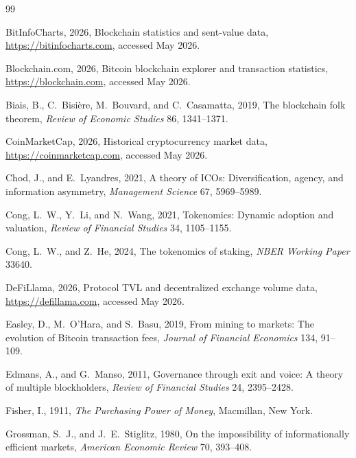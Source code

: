 \documentclass[12pt]{article}
\begin{document}
\begin{thebibliography}{99}

BitInfoCharts, 2026, Blockchain statistics and sent-value data,
\url{https://bitinfocharts.com}, accessed May 2026.

Blockchain.com, 2026, Bitcoin blockchain explorer and transaction statistics,
\url{https://blockchain.com}, accessed May 2026.

Biais, B., C.~Bisière, M.~Bouvard, and C.~Casamatta, 2019, The blockchain folk theorem,
\textit{Review of Economic Studies} 86, 1341--1371.

CoinMarketCap, 2026, Historical cryptocurrency market data,
\url{https://coinmarketcap.com}, accessed May 2026.

Chod, J., and E.~Lyandres, 2021, A theory of ICOs: Diversification, agency, and
information asymmetry, \textit{Management Science} 67, 5969--5989.

Cong, L.~W., Y.~Li, and N.~Wang, 2021, Tokenomics: Dynamic adoption and valuation,
\textit{Review of Financial Studies} 34, 1105--1155.

Cong, L.~W., and Z.~He, 2024, The tokenomics of staking,
\textit{NBER Working Paper} 33640.

DeFiLlama, 2026, Protocol TVL and decentralized exchange volume data,
\url{https://defillama.com}, accessed May 2026.

Easley, D., M.~O'Hara, and S.~Basu, 2019, From mining to markets: The evolution of
Bitcoin transaction fees, \textit{Journal of Financial Economics} 134, 91--109.

Edmans, A., and G.~Manso, 2011, Governance through exit and voice: A theory of
multiple blockholders, \textit{Review of Financial Studies} 24, 2395--2428.

Fisher, I., 1911, \textit{The Purchasing Power of Money},
Macmillan, New York.

Grossman, S.~J., and J.~E.~Stiglitz, 1980, On the impossibility of informationally
efficient markets, \textit{American Economic Review} 70, 393--408.


\end{thebibliography}
\end{document}
